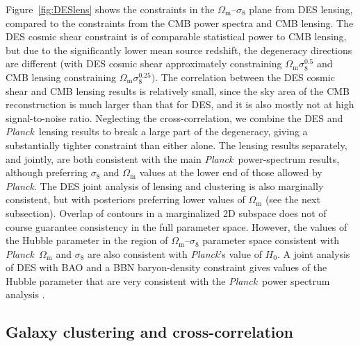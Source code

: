 \documentclass[longauth,traditabstract]{aa}
\def\Planck{\textit{Planck}}
\providecommand{\Omm}{\Omega_{\mathrm{m}}}
\newcommand{\planck}{\Planck}
\begin{document}
Figure~\ref{fig:DESlens} shows the constraints in the $\Omm$--$\sigma_8$ plane from DES lensing, compared to the constraints from the CMB power spectra and CMB lensing. The DES cosmic shear constraint is of comparable statistical power to CMB lensing, but due to the significantly lower mean source redshift, the degeneracy directions are different (with DES cosmic shear approximately constraining $\Omm\sigma_8^{0.5}$ and CMB lensing constraining $\Omm\sigma_8^{0.25})$.
The correlation between the DES cosmic shear and CMB lensing results is relatively small, since the sky area of the CMB reconstruction is much larger than that for DES, and it is also mostly not at high signal-to-noise ratio. Neglecting the cross-correlation,
we combine the DES and \planck\ lensing results to break a large part of the degeneracy, giving a substantially tighter constraint than either alone. The lensing results separately, and jointly, are both consistent with the main \planck\ power-spectrum results, although preferring $\sigma_8$ and $\Omm$ values at the lower end of those allowed by \planck. The DES joint analysis of lensing and clustering is also marginally consistent, but with posteriors preferring lower values of $\Omm$ (see the next subsection).
Overlap of contours in a marginalized 2D subspace does not of course guarantee consistency in the full parameter space. However, the values of the Hubble parameter in the region of $\Omm$--$\sigma_8$ parameter space consistent with \planck\ $\Omm$ and $\sigma_8$ are also consistent with \planck's value of $H_0$.
A joint analysis of DES with BAO and a BBN baryon-density constraint gives values of the Hubble parameter that are very consistent with the \planck\ power spectrum analysis \citep{Abbott:2017smn}.


\subsection{Galaxy clustering and cross-correlation}
\label{sec:galaxyclustering}
\end{document}
